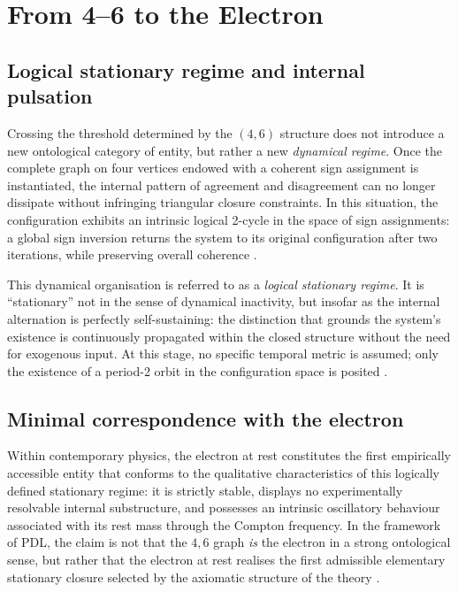 \documentclass{article}
\begin{document}
\section{From 4--6 to the Electron}
\label{sec:four_six_electron}

\subsection{Logical stationary regime and internal pulsation}
\label{subsec:logical_stationary}

Crossing the threshold determined by the \((4,6)\) structure does not introduce a new ontological category of entity, but rather a new \emph{dynamical regime}. Once the complete graph on four vertices endowed with a coherent sign assignment is instantiated, the internal pattern of agreement and disagreement can no longer dissipate without infringing triangular closure constraints. In this situation, the configuration exhibits an intrinsic logical 2-cycle in the space of sign assignments: a global sign inversion returns the system to its original configuration after two iterations, while preserving overall coherence
\cite{PDL_Main_2026,PDL_intro}.

This dynamical organisation is referred to as a \emph{logical stationary regime}. It is “stationary” not in the sense of dynamical inactivity, but insofar as the internal alternation is perfectly self-sustaining: the distinction that grounds the system’s existence is continuously propagated within the closed structure without the need for exogenous input. At this stage, no specific temporal metric is assumed; only the existence of a period-2 orbit in the configuration space is posited
\cite{PDL_Main_2026,PDL_position}.

\subsection{Minimal correspondence with the electron}
\label{subsec:electron_correspondence}

Within contemporary physics, the electron at rest constitutes the first empirically accessible entity that conforms to the qualitative characteristics of this logically defined stationary regime: it is strictly stable, displays no experimentally resolvable internal substructure, and possesses an intrinsic oscillatory behaviour associated with its rest mass through the Compton frequency. In the framework of PDL, the claim is not that the \(4,6\) graph \emph{is} the electron in a strong ontological sense, but rather that the electron at rest realises the first admissible elementary stationary closure selected by the axiomatic structure of the theory \cite{PDL_Main_2026,PDL_intro}.
\end{document}
